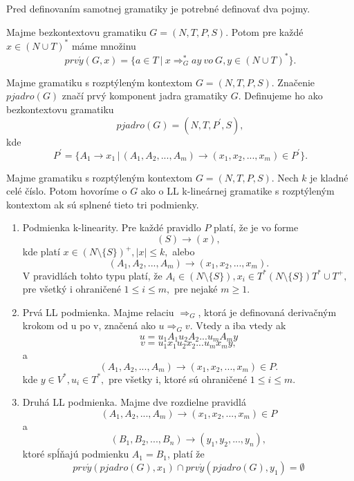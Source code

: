 Pred definovaním samotnej gramatiky je potrebné definovať dva pojmy.

\begin{definition}
Majme bezkontextovu gramatiku $G = (N, T, P, S)$. Potom pre každé $x \in (N \cup T)^*$ máme množinu $$prv\acute{y}(G,x) = \{a \in T \: | \: x \Rightarrow^*_G ay \: vo \: G, y \in (N \cup T)^*\}.$$ 
\end{definition}

\begin{definition}
Majme gramatiku s rozptýleným kontextom $G = (N, T, P, S)$. Značenie $pjadro(G)$ značí prvý komponent jadra gramatiky $G$. Definujeme ho ako bezkontextovu gramatiku $$pjadro(G) = (N,T,P^\prime,S),$$ kde $$P^\prime = \{A_1 \rightarrow x_1 \, | \, (A_1, A_2, ..., A_m) \rightarrow (x_1, x_2, ..., x_m) \in P^\prime\}.$$
\end{definition}

\begin{definition}
\label{def:ll}
Majme gramatiku s rozptýleným kontextom $G = (N, T, P, S)$. Nech $k$ je kladné celé číslo. Potom hovoríme o $G$ ako o LL k-lineárnej gramatike s rozptýleným kontextom ak sú splnené tieto tri podmienky. 
\end{definition}

\begin{enumerate}[label=\arabic*)]
    \item Podmienka k-linearity. Pre každé pravidlo $P$ platí, že je vo forme $$(S) \rightarrow (x),$$ kde platí $x \in (N \setminus \{S\})^+, |x| \leq k,$ alebo $$(A_1,A_2, ..., A_m) \rightarrow (x_1, x_2, ..., x_m).$$ V pravidlách tohto typu platí, že $A_i \in (N \setminus \{S\}), x_i \in T^*(N \setminus \{S\})T^* \cup T^+,$ pre všetký i ohraničené $1 \leq i \leq m, $ pre nejaké $m \geq 1.$
    
    \item Prvá LL podmienka. Majme relaciu $\Rightarrow_G$, ktorá je definovaná derivačným krokom od u po v, značená ako $u \Rightarrow_G v$. Vtedy a iba vtedy ak $$u = u_1A_1u_2A_2...u_mA_my$$ $$v = u_1x_1u_2x_2...u_mx_my,$$ a $$(A_1,A_2, ...,A_m) \rightarrow (x_1,x_2, ..., x_m) \in P.$$ kde $y \in V^*, u_i \in T^*,$ pre všetky i, ktoré sú ohraničené $1 \leq i \leq m.$ 
    
    \item Druhá LL podmienka. Majme dve rozdielne pravidlá $$(A_1,A_2, ...,A_m) \rightarrow (x_1, x_2, ..., x_m) \in P$$ a $$(B_1, B_2, ..., B_n) \rightarrow (y_1, y_2, ..., y_n),$$ ktoré spĺňajú podmienku $A_1 = B_1$, platí že $$prv\acute{y}(pjadro(G),x_1) \cap prv\acute{y}(pjadro(G),y_1) = \emptyset$$
\end{enumerate}


